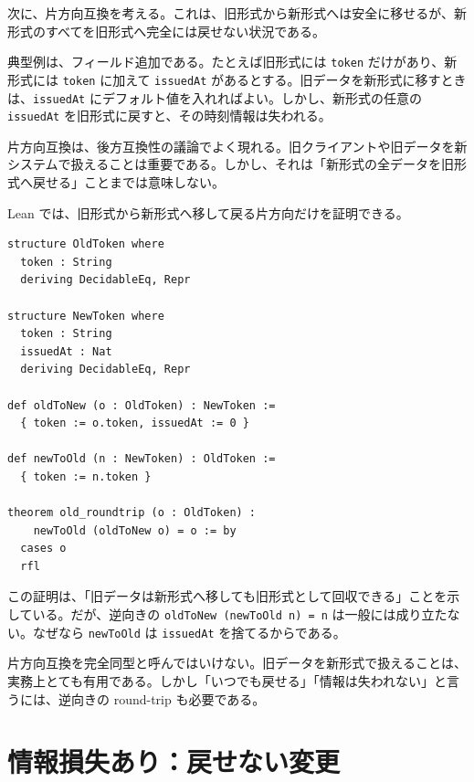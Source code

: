 次に、片方向互換を考える。これは、旧形式から新形式へは安全に移せるが、新形式のすべてを旧形式へ完全には戻せない状況である。

典型例は、フィールド追加である。たとえば旧形式には \texttt{token} だけがあり、新形式には \texttt{token} に加えて \texttt{issuedAt} があるとする。旧データを新形式に移すときは、\texttt{issuedAt} にデフォルト値を入れればよい。しかし、新形式の任意の \texttt{issuedAt} を旧形式に戻すと、その時刻情報は失われる。

\begin{softwarebox}
片方向互換は、後方互換性の議論でよく現れる。旧クライアントや旧データを新システムで扱えることは重要である。しかし、それは「新形式の全データを旧形式へ戻せる」ことまでは意味しない。
\end{softwarebox}

Lean では、旧形式から新形式へ移して戻る片方向だけを証明できる。

\begin{listing}[htbp]
\begin{verbatim}
structure OldToken where
  token : String
  deriving DecidableEq, Repr

structure NewToken where
  token : String
  issuedAt : Nat
  deriving DecidableEq, Repr

def oldToNew (o : OldToken) : NewToken :=
  { token := o.token, issuedAt := 0 }

def newToOld (n : NewToken) : OldToken :=
  { token := n.token }

theorem old_roundtrip (o : OldToken) :
    newToOld (oldToNew o) = o := by
  cases o
  rfl
\end{verbatim}
\caption{フィールド追加による片方向互換}
\label{lst:ch21-one-way}
\end{listing}

この証明は、「旧データは新形式へ移しても旧形式として回収できる」ことを示している。だが、逆向きの \texttt{oldToNew (newToOld n) = n} は一般には成り立たない。なぜなら \texttt{newToOld} は \texttt{issuedAt} を捨てるからである。

\begin{warningbox}
片方向互換を完全同型と呼んではいけない。旧データを新形式で扱えることは、実務上とても有用である。しかし「いつでも戻せる」「情報は失われない」と言うには、逆向きの round-trip も必要である。
\end{warningbox}

\section{情報損失あり：戻せない変更}

